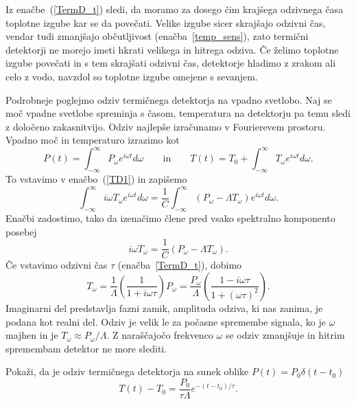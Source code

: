 Iz enačbe~(\ref{TermD_t}) sledi, da moramo za dosego čim krajšega odzivnega časa toplotne izgube 
kar se da povečati. Velike izgube sicer skrajšajo odzivni čas, 
vendar tudi zmanjšajo občutljivost (enačba~\ref{temp_sens}), 
zato termični detektorji ne morejo imeti hkrati velikega in hitrega odziva. 
Če želimo toplotne izgube povečati in s tem skrajšati odzivni čas, detektorje hladimo z zrakom 
ali celo z vodo, navzdol so toplotne izgube omejene s sevanjem.  

Podrobneje poglejmo odziv termičnega detektorja na vpadno svetlobo. Naj se  moč vpadne svetlobe
spreminja s časom, temperatura na detektorju pa temu sledi z določeno zakasnitvijo. Odziv
najlepše izračunamo v Fourierevem prostoru. Vpadno moč in temperaturo izrazimo kot
\begin{equation}
P(t) = \int_{-\infty}^{\infty} P_\omega e^{i\omega t}d\omega \qquad \mathrm{in} \qquad
T(t) = T_0 + \int_{-\infty}^{\infty} T_\omega e^{i\omega t}d\omega.
\label{TermTF}
\end{equation}
To vstavimo v enačbo~(\ref{TD1}) in zapišemo
\begin{equation}
\int_{-\infty}^{\infty} i \omega T_\omega e^{i\omega t}d\omega = \frac{1}{C}
\int_{-\infty}^{\infty} (P_\omega - \Lambda T_\omega) e^{i\omega t}d\omega.
\end{equation}
Enačbi zadostimo, tako da izenačimo člene pred vsako spektralno komponento posebej
\begin{equation}
i \omega T_\omega = \frac{1}{C}\left(P_\omega - \Lambda T_\omega\right).
\end{equation}
Če vstavimo odzivni čas $\tau$ (enačba~\ref{TermD_t}), dobimo
\begin{equation}
T_\omega = \frac{1}{\Lambda}\left(\frac{1}{1+i \omega \tau}\right)P_\omega = 
\frac{P_\omega}{\Lambda}\left(\frac{1-i \omega \tau}{1+(\omega \tau)^2}\right).
\label{TermOdziv}
\end{equation}
Imaginarni del predstavlja fazni zamik, amplituda odziva, ki nas zanima, je 
podana kot realni del. Odziv je velik le za počasne spremembe signala, ko
je $\omega$ majhen in je $T_\omega \approx P_\omega/\Lambda$. Z naraščajočo frekvenco
$\omega$ se odziv zmanjšuje in hitrim spremembam detektor ne more slediti. 
\begin{naloga}
Pokaži, da je odziv termičnega detektorja na sunek oblike $P(t) = P_0\delta(t-t_0)$
\begin{equation}
T(t)-T_0=\frac{P_0}{\tau\Lambda}e^{-(t-t_0)/\tau}.
\end{equation}
\end{naloga}

